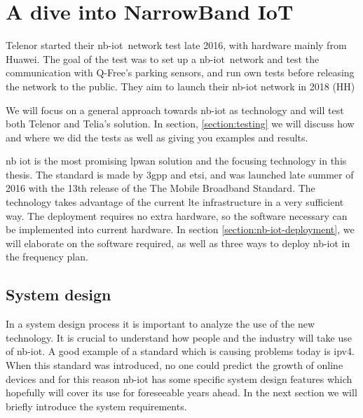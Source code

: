 \documentclass[USenglish]{ifimaster}  %
\begin{document}
\chapter{A dive into NarrowBand IoT} \label{section:nb-iot}
Telenor started their \acrshort{nb-iot} network test late 2016, with hardware mainly from Huawei. The goal of the test was to set up a \acrshort{nb-iot} network and test the communication with Q-Free's parking sensors, and run own tests before releasing the network to the public. They aim to launch their \acrshort{nb-iot} network in 2018 (HH)

We will focus on a general approach towards \acrshort{nb-iot} as technology and will test both Telenor and Telia's solution. In section, \vref{section:testing} we will discuss how and where we did the tests as well as giving you examples and results.

\acrfull{nb} \acrfull{iot} is the most promising \acrshort{lpwan} solution and the focusing technology in this thesis. The standard is made by \acrfull{3gpp} and \acrfull{etsi}, and was launched late summer of 2016 with the 13th release of the The Mobile Broadband Standard. The technology takes advantage of the current \acrshort{lte} infrastructure in a very sufficient way. The deployment requires no extra hardware, so the software necessary can be implemented into current hardware. In section \vref{section:nb-iot-deployment}, we will elaborate on the software required, as well as three ways to deploy \acrshort{nb-iot} in the frequency plan.

\section{System design}
In a system design process it is important to analyze the use of the new technology. It is crucial to understand how people and the industry will take use of \acrshort{nb-iot}. A good example of a standard which is causing problems today is \acrshort{ipv4}. When this standard was introduced, no one could predict the growth of online devices and for this reason \acrshort{nb-iot} has some specific system design features which hopefully will cover its use for foreseeable years ahead. In the next section we will briefly introduce the system requirements.
\end{document}
